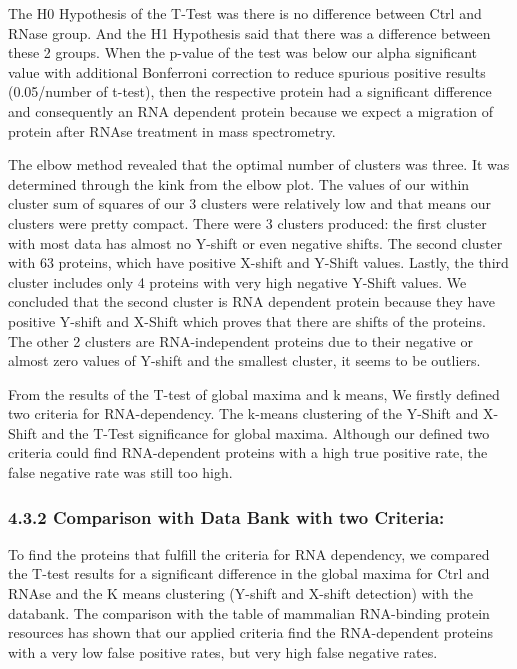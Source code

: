 \documentclass[
]{article}
\begin{document}
The H0 Hypothesis of the T-Test was there is no difference between Ctrl
and RNase group. And the H1 Hypothesis said that there was a difference
between these 2 groups. When the p-value of the test was below our alpha
significant value with additional Bonferroni correction to reduce
spurious positive results (0.05/number of t-test), then the respective
protein had a significant difference and consequently an RNA dependent
protein because we expect a migration of protein after RNAse treatment
in mass spectrometry.

The elbow method revealed that the optimal number of clusters was three.
It was determined through the kink from the elbow plot. The values of
our within cluster sum of squares of our 3 clusters were relatively low
and that means our clusters were pretty compact. There were 3 clusters
produced: the first cluster with most data has almost no Y-shift or even
negative shifts. The second cluster with 63 proteins, which have
positive X-shift and Y-Shift values. Lastly, the third cluster includes
only 4 proteins with very high negative Y-Shift values. We concluded
that the second cluster is RNA dependent protein because they have
positive Y-shift and X-Shift which proves that there are shifts of the
proteins. The other 2 clusters are RNA-independent proteins due to their
negative or almost zero values of Y-shift and the smallest cluster, it
seems to be outliers.

From the results of the T-test of global maxima and k means, We firstly
defined two criteria for RNA-dependency. The k-means clustering of the
Y-Shift and X-Shift and the T-Test significance for global maxima.
Although our defined two criteria could find RNA-dependent proteins with
a high true positive rate, the false negative rate was still too high.

\hypertarget{comparison-with-data-bank-with-two-criteria-1}{%
\subsubsection{4.3.2 Comparison with Data Bank with two
Criteria:}\label{comparison-with-data-bank-with-two-criteria-1}}

To find the proteins that fulfill the criteria for RNA dependency, we
compared the T-test results for a significant difference in the global
maxima for Ctrl and RNAse and the K means clustering (Y-shift and
X-shift detection) with the databank. The comparison with the table of
mammalian RNA-binding protein resources has shown that our applied
criteria find the RNA-dependent proteins with a very low false positive
rates, but very high false negative rates.
\end{document}
